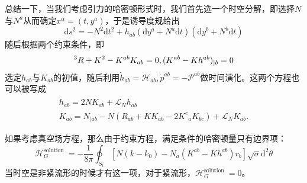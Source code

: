 \documentclass[hyperref, UTF8, a4paper]{ctexart}
\begin{document}
总结一下，当我们考虑引力的哈密顿形式时，我们首先选一个时空分解，即选择$N$与$N^{a}$从而确定$x^{\alpha } =(t,y^{a} )$，于是诱导度规给出
\begin{equation*}
	\mathrm{d} s^{2} =-N^{2}\mathrm{d} t^{2} +h_{ab} (\mathrm{d} y^{a} +N^{a}\mathrm{d} t)(\mathrm{d} y^{b} +N^{b}\mathrm{d} t)
\end{equation*}
随后根据两个约束条件，即
\begin{equation*}
	\prescript{3}{}{} R+K^{2} -K^{ab} K_{ab} =0,(K^{ab} -Kh^{ab} )_{|b} =0
\end{equation*}
选定$h_{ab}$与$K_{ab}$的初值，随后利用$\dot{h}_{ab} =\mathcal{H}_{ab} ,\dot{p}^{ab} =-\mathcal{P}^{ab}$做时间演化。这两个方程也可以被写成
\begin{gather*}
	\dot{h}_{ab} =2NK_{ab} +\mathcal{L}_{N} h_{ab}\\
	\dot{K}_{ab} =N_{\mid ab} -N\left( R_{ab} +KK_{ab} -2K^{c}{}_{a} K_{bc}\right) +\mathcal{L}_{N} K_{ab} .
\end{gather*}


如果考虑真空场方程，那么由于约束方程，满足条件的哈密顿量只有边界项：
\begin{equation*}
	\mathcal{H}_{G}^{\text{solution }} =-\frac{1}{8\pi }\oint _{S_{t}}\left[ N( k-k_{0}) -N_{a}\left( K^{ab} -Kh^{ab}\right) r_{b}\right]\sqrt{\sigma }\mathrm{d}^{2} \theta 
\end{equation*}
当时空是非紧流形的时候才有这一项，对于紧流形，$\mathcal{H}_{G}^{\text{solution }} =0$。
\end{document}
